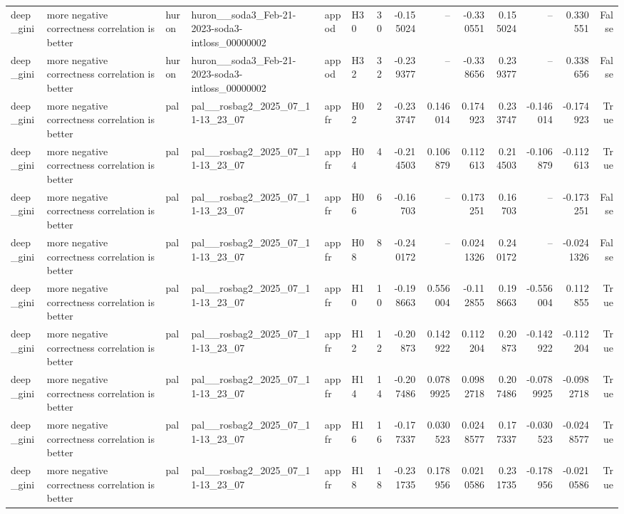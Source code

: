 \begin{longtable}{llllllrrrrrrrr}
deep\_gini & more negative correctness correlation is better & huron & huron\_\_soda3\_Feb-21-2023-soda3-intloss\_00000002 & appod & H30 & 30 & -0.155024 & -- & -0.330551 & 0.155024 & -- & 0.330551 & False \\
deep\_gini & more negative correctness correlation is better & huron & huron\_\_soda3\_Feb-21-2023-soda3-intloss\_00000002 & appod & H32 & 32 & -0.239377 & -- & -0.338656 & 0.239377 & -- & 0.338656 & False \\
deep\_gini & more negative correctness correlation is better & pal & pal\_\_rosbag2\_2025\_07\_11-13\_23\_07 & appfr & H02 & 2 & -0.233747 & 0.146014 & 0.174923 & 0.233747 & -0.146014 & -0.174923 & True \\
deep\_gini & more negative correctness correlation is better & pal & pal\_\_rosbag2\_2025\_07\_11-13\_23\_07 & appfr & H04 & 4 & -0.214503 & 0.106879 & 0.112613 & 0.214503 & -0.106879 & -0.112613 & True \\
deep\_gini & more negative correctness correlation is better & pal & pal\_\_rosbag2\_2025\_07\_11-13\_23\_07 & appfr & H06 & 6 & -0.16703 & -- & 0.173251 & 0.16703 & -- & -0.173251 & False \\
deep\_gini & more negative correctness correlation is better & pal & pal\_\_rosbag2\_2025\_07\_11-13\_23\_07 & appfr & H08 & 8 & -0.240172 & -- & 0.0241326 & 0.240172 & -- & -0.0241326 & False \\
deep\_gini & more negative correctness correlation is better & pal & pal\_\_rosbag2\_2025\_07\_11-13\_23\_07 & appfr & H10 & 10 & -0.198663 & 0.556004 & -0.112855 & 0.198663 & -0.556004 & 0.112855 & True \\
deep\_gini & more negative correctness correlation is better & pal & pal\_\_rosbag2\_2025\_07\_11-13\_23\_07 & appfr & H12 & 12 & -0.20873 & 0.142922 & 0.112204 & 0.20873 & -0.142922 & -0.112204 & True \\
deep\_gini & more negative correctness correlation is better & pal & pal\_\_rosbag2\_2025\_07\_11-13\_23\_07 & appfr & H14 & 14 & -0.207486 & 0.0789925 & 0.0982718 & 0.207486 & -0.0789925 & -0.0982718 & True \\
deep\_gini & more negative correctness correlation is better & pal & pal\_\_rosbag2\_2025\_07\_11-13\_23\_07 & appfr & H16 & 16 & -0.177337 & 0.030523 & 0.0248577 & 0.177337 & -0.030523 & -0.0248577 & True \\
deep\_gini & more negative correctness correlation is better & pal & pal\_\_rosbag2\_2025\_07\_11-13\_23\_07 & appfr & H18 & 18 & -0.231735 & 0.178956 & 0.0210586 & 0.231735 & -0.178956 & -0.0210586 & True \\

\end{longtable}
